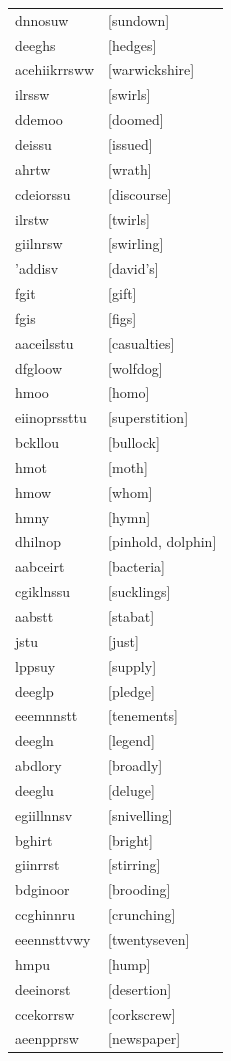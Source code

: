 \documentclass{article}
\begin{document}
\begin{tabular}{ll}
dnnosuw & [sundown] \\
deeghs & [hedges] \\
acehiikrrsww & [warwickshire] \\
ilrssw & [swirls] \\
ddemoo & [doomed] \\
deissu & [issued] \\
ahrtw & [wrath] \\
cdeiorssu & [discourse] \\
ilrstw & [twirls] \\
giilnrsw & [swirling] \\
'addisv & [david's] \\
fgit & [gift] \\
fgis & [figs] \\
aaceilsstu & [casualties] \\
dfgloow & [wolfdog] \\
hmoo & [homo] \\
eiinoprssttu & [superstition] \\
bckllou & [bullock] \\
hmot & [moth] \\
hmow & [whom] \\
hmny & [hymn] \\
dhilnop & [pinhold, dolphin] \\
aabceirt & [bacteria] \\
cgiklnssu & [sucklings] \\
aabstt & [stabat] \\
jstu & [just] \\
lppsuy & [supply] \\
deeglp & [pledge] \\
eeemnnstt & [tenements] \\
deegln & [legend] \\
abdlory & [broadly] \\
deeglu & [deluge] \\
egiillnnsv & [snivelling] \\
bghirt & [bright] \\
giinrrst & [stirring] \\
bdginoor & [brooding] \\
ccghinnru & [crunching] \\
eeennsttvwy & [twentyseven] \\
hmpu & [hump] \\
deeinorst & [desertion] \\
ccekorrsw & [corkscrew] \\
aeenpprsw & [newspaper] \\

\end{tabular}
\end{document}
